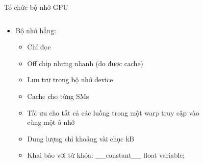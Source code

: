 \documentclass[10pt]{beamer}
\theoremstyle{remark}
\numberwithin{algocf}{section}
\numberwithin{equation}{section}
\numberwithin{dl}{section}
\numberwithin{figure}{section}
\begin{document}
\begin{frame}{Tổ chức bộ nhớ GPU}
    \begin{columns}[onlytextwidth]
        \begin{column}{0.5\linewidth}
            \begin{itemize}
                \item Bộ nhớ hằng:
                \begin{itemize}
                    \item Chỉ đọc
                    \item Off chip nhưng nhanh (do được cache)
                    \item Lưu trữ trong bộ nhớ device
                    \item Cache cho từng SMs 
                    \item Tối ưu cho tất cả các luồng trong một warp truy cập vào cùng một ô nhớ
                    \item Dung lượng chỉ khoảng vài chục kB 
                    \item Khai báo với từ khóa: \_\_constant\_\_ float variable;
                \end{itemize}
            \end{itemize}
        \end{column}
        \begin{column}{0.5\linewidth}
            \begin{figure}[H]
                \centering

\end{figure}
\end{column}
\end{columns}
\end{frame}
\end{document}
